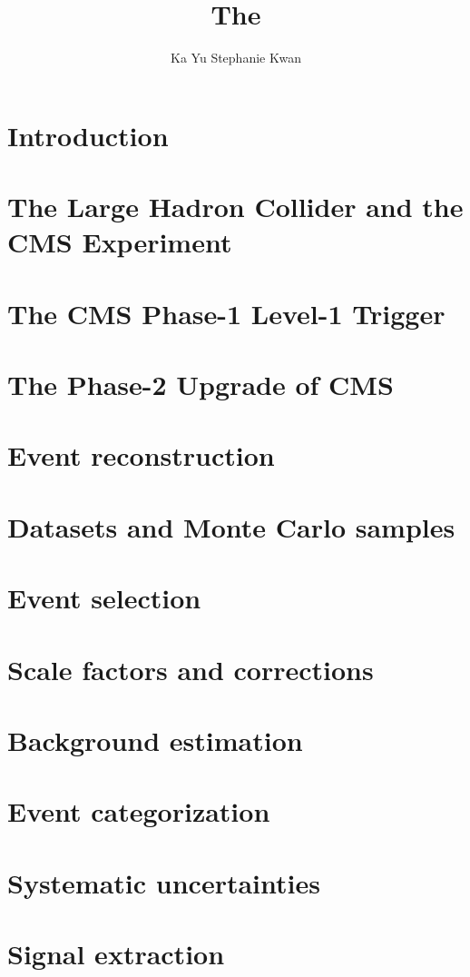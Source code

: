 \documentclass[12pt,lot,lof]{puthesis}
\title{The}
\author{Ka Yu Stephanie Kwan}
\begin{document}
\chapter{Introduction}


\chapter{The Large Hadron Collider and the CMS Experiment}


\chapter{The CMS Phase-1 Level-1 Trigger}


\chapter{The Phase-2 Upgrade of CMS}
\label{chapter:phase-2-upgrade-cms}


\chapter{Event reconstruction}


\chapter{Datasets and Monte Carlo samples}


\chapter{Event selection}


\chapter{Scale factors and corrections}
\label{chapter:ch-8:scale-factors-and-corrections}


\chapter{Background estimation}


\chapter{Event categorization}


\chapter{Systematic uncertainties}


\chapter{Signal extraction}

% 

 \label{bib}
\end{document}
